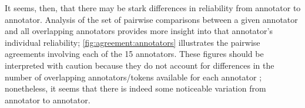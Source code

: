 	
	
	 It seems, then, that there may be stark differences in reliability from annotator to annotator. Analysis of the set of pairwise comparisons between a given annotator and all overlapping annotators provides more insight into that annotator's individual reliability; \cref{fig:agreement:annotators} illustrates the pairwise agreements involving each of the 15 annotators. These figures should be interpreted with caution because they do not account for differences in the number of overlapping annotators/tokens available for each annotator ; nonetheless, it seems that there is indeed some noticeable variation from annotator to annotator. 
		
